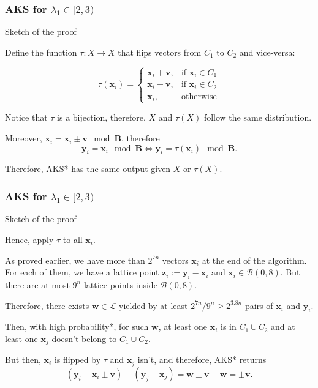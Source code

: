 \documentclass[aspectratio=43]{beamer}
\newcommand{\ball}[1]{\mathcal{B}(0, #1)}
\let\vec\mathbf %
\theoremstyle{remark}
\begin{document}
\begin{frame}
\frametitle{AKS for $\lambda_1 \in [2, 3)$}

Sketch of the proof
\vspace*{0.25cm}

Define the function $\tau: X \to X$ that flips vectors from $C_1$ to $C_2$ and 
vice-versa:

\begin{equation*}
\tau(\vec{x}_i) = \begin{cases}
               \vec{x}_i + \vec{v},    & \text{if } \vec{x}_i \in C_1\\
               \vec{x}_i - \vec{v},    & \text{if } \vec{x}_i \in C_2\\
               \vec{x}_i,              & \text{otherwise}
           \end{cases}
\end{equation*}

Notice that $\tau$ is a bijection, therefore, $X$ and $\tau(X)$ follow the same 
distribution.

Moreover, $\vec{x}_i = \vec{x}_i \pm \vec{v} \mod \vec B$, therefore 
$$\vec{y}_i = \vec{x}_i \mod \vec B \Leftrightarrow \vec{y}_i = \tau(\vec{x}_i) 
\mod \vec B.$$

Therefore, {\sc AKS*} has the same output given $X$ or $\tau(X)$.
\end{frame}


\begin{frame}
\frametitle{AKS for $\lambda_1 \in [2, 3)$}

Sketch of the proof
\vspace*{0.25cm}

Hence, apply $\tau$ to all $\vec{x}_i$.

As proved earlier, we have more than $2^{7n}$ vectors $\vec{x}_i$ at the end of 
the algorithm. For each of them, we have a lattice point $\vec{z}_i := 
\vec{y}_i - \vec{x}_i$ and $\vec{x}_i \in \ball{8}$. But there are at most 
$9^{n}$ lattice points inside $\ball{8}$.

Therefore, there exists $\vec{w} \in \mathcal{L}$ yielded by at least $2^{7n} / 
9^n \ge 2^{3.8n}$ pairs of $\vec{x}_i$ and $\vec{y}_i$.

Then, with high probability*, for such $\vec{w}$, at least one $\vec{x}_i$ is 
in 
$C_1 \cup C_2$ and at least one $\vec{x}_j$ doesn't belong to $C_1 \cup C_2$.

But then, $\vec{x}_i$ is flipped by $\tau$ and $\vec{x}_j$ isn't, and 
therefore, {\sc AKS*} returns 
$$(\vec{y}_i - \vec{x}_i \pm \vec{v}) - (\vec{y}_j - \vec{x}_j) = \vec{w} \pm 
\vec{v} - \vec{w} = \pm \vec{v}.$$



\end{frame}
\end{document}
